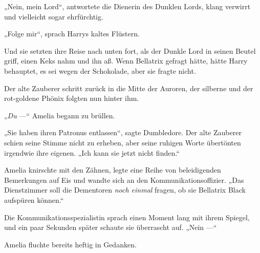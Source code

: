 „Nein, mein Lord“, antwortete die Dienerin des Dunklen Lords, klang verwirrt und vielleicht sogar ehrfürchtig.

„Folge mir“, sprach Harrys kaltes Flüstern.

Und sie setzten ihre Reise nach unten fort, als der Dunkle Lord in seinen Beutel griff, einen Keks nahm und ihn aß. Wenn Bellatrix gefragt hätte, hätte Harry behauptet, es sei wegen der Schokolade, aber sie fragte nicht.

\later

Der alte Zauberer schritt zurück in die Mitte der Auroren, der silberne und der rot-goldene Phönix folgten nun hinter ihm.

„\emph{Du} —“ Amelia begann zu brüllen.

„Sie haben ihren Patronus entlassen“, sagte Dumbledore. Der alte Zauberer schien seine Stimme nicht zu erheben, aber seine ruhigen Worte übertönten irgendwie ihre eigenen.
„Ich kann sie jetzt nicht finden.“

Amelia knirschte mit den Zähnen, legte eine Reihe von beleidigenden Bemerkungen auf Eis und wandte sich an den Kommunikationsoffizier.
„Das Dienstzimmer soll die Dementoren \emph{noch einmal} fragen, ob sie Bellatrix Black aufspüren können.“

Die Kommunikationsspezialistin sprach einen Moment lang mit ihrem Spiegel, und ein paar Sekunden später schaute sie überrascht auf.
„Nein —“

Amelia fluchte bereits heftig in Gedanken.

